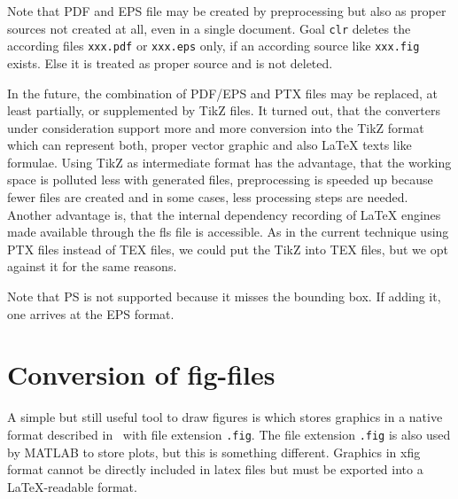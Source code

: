 Note that PDF and EPS file may be created by preprocessing 
but also as proper sources not created at all, 
even in a single document. 
Goal \texttt{clr} deletes the according files \texttt{xxx.pdf} or \texttt{xxx.eps} only, 
if an according source like \texttt{xxx.fig} exists. 
Else it is treated as proper source and is not deleted. 


In the future, the combination of PDF/EPS and PTX files may be replaced, 
at least partially, or supplemented by TikZ files. 
It turned out, that the converters under consideration 
support more and more conversion into the TikZ format 
which can represent both, proper vector graphic and also \LaTeX{} texts like formulae. 
Using TikZ as intermediate format has the advantage, 
that the working space is polluted less with generated files, 
preprocessing is speeded up because fewer files are created and in some cases, 
less processing steps are needed. 
Another advantage is, that the internal dependency recording of \LaTeX{} engines 
made available through the \gls{fls} file is accessible. 
As in the current technique using PTX files instead of TEX files, 
we could put the TikZ into TEX files, but we opt against it for the same reasons. 

Note that PS is not supported because it misses the bounding box. 
If adding it, one arrives at the EPS format. 



\section{Conversion of fig-files}\label{sec:fig2dev}



A simple but still useful tool to draw figures is  
which stores graphics in a native format 
described in~\cite{XFigF} with file extension \texttt{.fig}. 
The file extension \texttt{.fig} is also used by MATLAB to store plots, 
but this is something different. 
Graphics in xfig format cannot be directly included in latex files 
but must be exported into a \LaTeX-readable format. 

